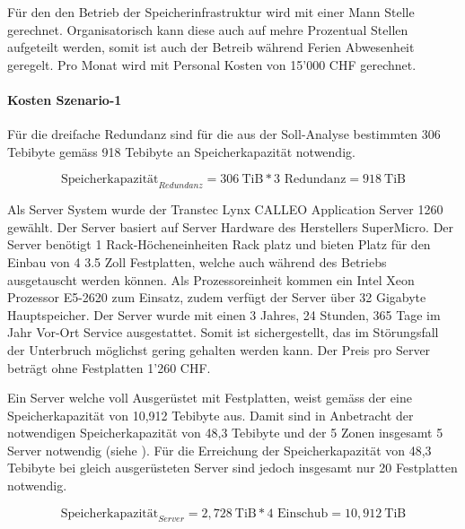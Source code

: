 Für den den Betrieb der Speicherinfrastruktur wird mit einer Mann Stelle gerechnet. Organisatorisch kann diese auch auf mehre Prozentual Stellen aufgeteilt werden, somit ist auch der Betreib während Ferien Abwesenheit geregelt. Pro Monat wird mit Personal Kosten von 15'000 CHF gerechnet.


\paragraph*{Kosten Szenario-1}

Für die dreifache Redundanz sind für die aus der Soll-Analyse bestimmten 306 Tebibyte gemäss  918 Tebibyte an Speicherkapazität notwendig.

\begin{equation}
\mbox{Speicherkapazität}_{Redundanz} = 306  \mathrm{\ TiB} * 3 \mbox{\ Redundanz} =  918 \mathrm{\ TiB}
\label{eqn:SpeicherkapazitätS1}
\end{equation}


Als Server System wurde der Transtec Lynx CALLEO Application Server 1260 gewählt. Der Server basiert auf Server Hardware des Herstellers  SuperMicro. Der Server benötigt 1 Rack-Höcheneinheiten Rack platz und bieten Platz für den Einbau von 4 3.5 Zoll Festplatten, welche auch während des Betriebs ausgetauscht werden können. Als Prozessoreinheit kommen ein Intel Xeon Prozessor E5-2620 zum Einsatz, zudem verfügt der Server über 32 Gigabyte Hauptspeicher. Der Server wurde mit einen 3 Jahres, 24 Stunden, 365 Tage im Jahr Vor-Ort Service ausgestattet. Somit ist sichergestellt, das im Störungsfall der Unterbruch möglichst gering gehalten werden kann. Der Preis pro Server beträgt ohne Festplatten 1'260 CHF.


Ein Server welche voll Ausgerüstet mit Festplatten, weist gemäss der   eine Speicherkapazität von 10,912 Tebibyte aus. Damit sind in Anbetracht der notwendigen Speicherkapazität von 48,3 Tebibyte und der 5 Zonen insgesamt 5 Server notwendig (siehe ). Für die Erreichung der Speicherkapazität von 48,3 Tebibyte bei gleich ausgerüsteten Server sind jedoch insgesamt nur 20 Festplatten notwendig.

\begin{equation}
\mbox{Speicherkapazität}_{Server} = 2,728 \mathrm{\ TiB} * 4 \mbox{\ Einschub} =  10,912 \mathrm{\ TiB}
\label{eqn:SpeicherkapazitätServerS1}
\end{equation}

